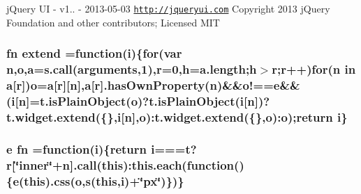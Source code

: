 j\-Query U\-I -\/ v1.. -\/ 2013-\/05-\/03 \href{http://jqueryui.com}{\tt http\-://jqueryui.\-com} Copyright 2013 j\-Query Foundation and other contributors; Licensed M\-I\-T \hypertarget{root_2static_2root_2js_2bootstrap_2jquery-ui-1_810_84_8custom_8min_8js_a8974eac3f1a5d8695597278e094a87e8}{
\subsubsection[{extend}]{ {\bf fn} extend =function({\bf i})\{{\bf for}(var {\bf n},{\bf o},{\bf a}={\bf s.\-call}(arguments,1),{\bf r}=0,{\bf h}=a.\-length;{\bf h}$>${\bf r};{\bf r}++){\bf for}({\bf n} in {\bf a}\mbox{[}{\bf r}\mbox{]}){\bf o}={\bf a}\mbox{[}{\bf r}\mbox{]}\mbox{[}{\bf n}\mbox{]},{\bf a}\mbox{[}{\bf r}\mbox{]}.has\-Own\-Property({\bf n})\&\&o!=={\bf e}\&\&({\bf i}\mbox{[}{\bf n}\mbox{]}=t.\-is\-Plain\-Object({\bf o})?t.\-is\-Plain\-Object({\bf i}\mbox{[}{\bf n}\mbox{]})?t.\-widget.\-extend(\{\},{\bf i}\mbox{[}{\bf n}\mbox{]},{\bf o})\-:t.\-widget.\-extend(\{\},{\bf o})\-:{\bf o});return {\bf i}\}}}\label{root_2static_2root_2js_2bootstrap_2jquery-ui-1_810_84_8custom_8min_8js_a8974eac3f1a5d8695597278e094a87e8}
\hypertarget{root_2static_2root_2js_2bootstrap_2jquery-ui-1_810_84_8custom_8min_8js_a56db16be2cdccd24996078805b728cb4}{
\subsubsection[{fn}]{ {\bf e} fn =function({\bf i})\{return {\bf i}==={\bf t}?{\bf r}\mbox{[}\char`\"{}inner\char`\"{}+n\mbox{]}.{\bf call}(this)\-:{\bf this.\-each}(function()\{{\bf e}(this).css({\bf o},{\bf s}(this,{\bf i})+\char`\"{}px\char`\"{})\})\}}}\label{root_2static_2root_2js_2bootstrap_2jquery-ui-1_810_84_8custom_8min_8js_a56db16be2cdccd24996078805b728cb4}
